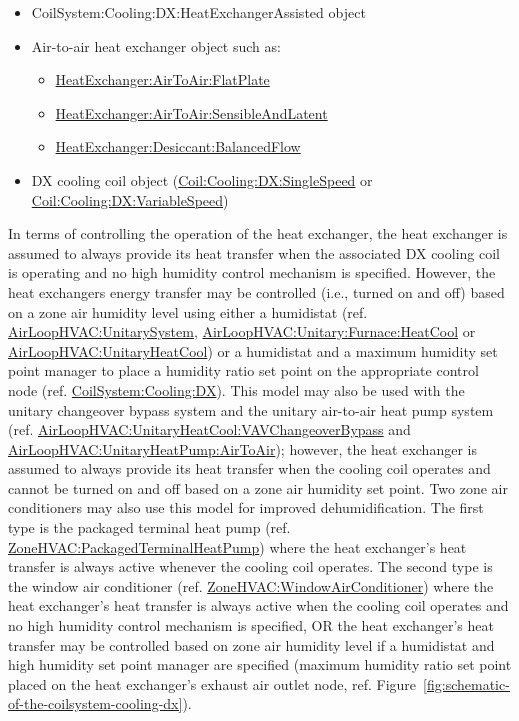 \begin{itemize}
\item
  CoilSystem:Cooling:DX:HeatExchangerAssisted object
\item
  Air-to-air heat exchanger object such as:
\begin{itemize}
\item
\hyperref[heatexchangerairtoairflatplate]{HeatExchanger:AirToAir:FlatPlate}
\item
\hyperref[heatexchangerairtoairsensibleandlatent]{HeatExchanger:AirToAir:SensibleAndLatent}
\item
\hyperref[heatexchangerdesiccantbalancedflow]{HeatExchanger:Desiccant:BalancedFlow}
\end{itemize}
\item
  DX cooling coil object (\hyperref[coilcoolingdxsinglespeed]{Coil:Cooling:DX:SingleSpeed} or \hyperref[coilcoolingdxvariablespeed]{Coil:Cooling:DX:VariableSpeed})
\end{itemize}

In terms of controlling the operation of the heat exchanger, the heat exchanger is assumed to always provide its heat transfer when the associated DX cooling coil is operating and no high humidity control mechanism is specified. However, the heat exchanger\textquotesingle s energy transfer may be controlled (i.e., turned on and off) based on a zone air humidity level using either a humidistat (ref. \hyperref[airloophvacunitarysystem]{AirLoopHVAC:UnitarySystem}, \hyperref[airloophvacunitaryfurnaceheatcool]{AirLoopHVAC:Unitary:Furnace:HeatCool} or \hyperref[airloophvacunitaryheatcool]{AirLoopHVAC:UnitaryHeatCool}) or a humidistat and a maximum humidity set point manager to place a humidity ratio set point on the appropriate control node (ref. \hyperref[coilsystemcoolingdx]{CoilSystem:Cooling:DX}). This model may also be used with the unitary changeover bypass system and the unitary air-to-air heat pump system (ref. \hyperref[airloophvacunitaryheatcoolvavchangeoverbypass]{AirLoopHVAC:UnitaryHeatCool:VAVChangeoverBypass} and \hyperref[airloophvacunitaryheatpumpairtoair]{AirLoopHVAC:UnitaryHeatPump:AirToAir}); however, the heat exchanger is assumed to always provide its heat transfer when the cooling coil operates and cannot be turned on and off based on a zone air humidity set point. Two zone air conditioners may also use this model for improved dehumidification. The first type is the packaged terminal heat pump (ref. \hyperref[zonehvacpackagedterminalheatpump]{ZoneHVAC:PackagedTerminalHeatPump}) where the heat exchanger's heat transfer is always active whenever the cooling coil operates. The second type is the window air conditioner (ref. \hyperref[zonehvacwindowairconditioner]{ZoneHVAC:WindowAirConditioner}) where the heat exchanger's heat transfer is always active when the cooling coil operates and no high humidity control mechanism is specified, OR the heat exchanger's heat transfer may be controlled based on zone air humidity level if a humidistat and high humidity set point manager are specified (maximum humidity ratio set point placed on the heat exchanger's exhaust air outlet node, ref. Figure~\ref{fig:schematic-of-the-coilsystem-cooling-dx}).

